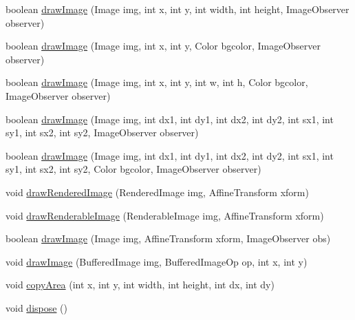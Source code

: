 \begin{DoxyCompactItemize}
\item 
boolean \mbox{\hyperlink{classorg_1_1jfree_1_1chart_1_1fx_1_1_f_x_graphics2_d_a93fb47c5e3c17715978b4a2cc5a79d2b}{draw\+Image}} (Image img, int x, int y, int width, int height, Image\+Observer observer)
\item 
boolean \mbox{\hyperlink{classorg_1_1jfree_1_1chart_1_1fx_1_1_f_x_graphics2_d_ac7266ab3d304480fbbf6d16190670ccf}{draw\+Image}} (Image img, int x, int y, Color bgcolor, Image\+Observer observer)
\item 
boolean \mbox{\hyperlink{classorg_1_1jfree_1_1chart_1_1fx_1_1_f_x_graphics2_d_afc6a477d5f8c71c4555379a966111e7b}{draw\+Image}} (Image img, int x, int y, int w, int h, Color bgcolor, Image\+Observer observer)
\item 
boolean \mbox{\hyperlink{classorg_1_1jfree_1_1chart_1_1fx_1_1_f_x_graphics2_d_a4239e8725545952d89afbfa68966f0b6}{draw\+Image}} (Image img, int dx1, int dy1, int dx2, int dy2, int sx1, int sy1, int sx2, int sy2, Image\+Observer observer)
\item 
boolean \mbox{\hyperlink{classorg_1_1jfree_1_1chart_1_1fx_1_1_f_x_graphics2_d_afa8e7e2b4465e0bb3bfbe816ecc35bf2}{draw\+Image}} (Image img, int dx1, int dy1, int dx2, int dy2, int sx1, int sy1, int sx2, int sy2, Color bgcolor, Image\+Observer observer)
\item 
void \mbox{\hyperlink{classorg_1_1jfree_1_1chart_1_1fx_1_1_f_x_graphics2_d_a5c86c55195165c06fc6369b90f17c29d}{draw\+Rendered\+Image}} (Rendered\+Image img, Affine\+Transform xform)
\item 
void \mbox{\hyperlink{classorg_1_1jfree_1_1chart_1_1fx_1_1_f_x_graphics2_d_ac2f117b14dafdfe9924d3f259c662fb8}{draw\+Renderable\+Image}} (Renderable\+Image img, Affine\+Transform xform)
\item 
boolean \mbox{\hyperlink{classorg_1_1jfree_1_1chart_1_1fx_1_1_f_x_graphics2_d_a260512061fa64e94cb0a28fcbe188dd5}{draw\+Image}} (Image img, Affine\+Transform xform, Image\+Observer obs)
\item 
void \mbox{\hyperlink{classorg_1_1jfree_1_1chart_1_1fx_1_1_f_x_graphics2_d_af10c7f3a878b865444e354726d59595f}{draw\+Image}} (Buffered\+Image img, Buffered\+Image\+Op op, int x, int y)
\item 
void \mbox{\hyperlink{classorg_1_1jfree_1_1chart_1_1fx_1_1_f_x_graphics2_d_a371449f77e28d7ba1bfe40d810ef97dc}{copy\+Area}} (int x, int y, int width, int height, int dx, int dy)
\item 
void \mbox{\hyperlink{classorg_1_1jfree_1_1chart_1_1fx_1_1_f_x_graphics2_d_a1c410035cd77bd58ffa23baceca6f296}{dispose}} ()
\end{DoxyCompactItemize}


